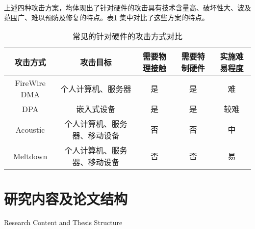 上述四种攻击方案，均体现出了针对硬件的攻击具有技术含量高、破坏性大、波及范围广、难以预防及修复的特点。表\ref{tab:hw-attack-comp}
集中对比了这些方案的特点。

\begin{table}[!ht]
	\centering
\begin{threeparttable}[b]
\caption{常见的针对硬件的攻击方式对比}
\begin{tabular}{ccccc}
	\toprule
	攻击方式 & 攻击目标 & 需要物理接触 & 需要特制硬件 & 实施难易程度 \\
	\midrule
	FireWire DMA\cite{becher2005firewire} & 个人计算机、服务器 & 是 & 是 & 难 \\
	DPA\cite{kocher1999differential} & 嵌入式设备 & 是 & 是 & 较难 \\
	Acoustic\cite{acoustic} & 个人计算机、服务器、移动设备 & 否 & 否 & 中 \\
	Meltdown\cite{lipp_meltdown_2018} & 个人计算机、服务器、移动设备 & 否 & 否 & 易 \\
	\bottomrule
\end{tabular}
\label{tab:hw-attack-comp}
\end{threeparttable}
\end{table}


\section{研究内容及论文结构}{Research Content and Thesis Structure}
\somewords


\newpage
